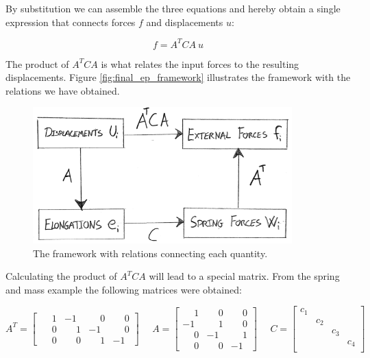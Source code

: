 By substitution we can assemble the three equations and
hereby obtain a single expression that connects forces $f$ and
displacements $u$:

\begin{equation}
\label{eq:f_eq_at_c_a_u}
f = A^T C A \ u
\end{equation}

The product of $A^T C A$ is what relates the input forces to the
resulting displacements. Figure \vref{fig:final_ep_framework}
illustrates the framework with the relations we have obtained.

\begin{figure}
  \centering
  \includegraphics[width=10cm]{./images/equilibrium_framework_final_ep_framework.png}
\caption{The framework with relations connecting each quantity.}
\label{fig:final_ep_framework}
\end{figure}


Calculating the product of $A^T C A$ will
lead to a special matrix. From the spring and mass example the
following matrices were obtained:

\begin{equation*}
A^T = 
\begin{bmatrix}
  \phantom{-}1 &           -1 & \phantom{-}0 & \phantom{-}0 \\
  \phantom{-}0 & \phantom{-}1 &           -1 & \phantom{-}0 \\
  \phantom{-}0 & \phantom{-}0 & \phantom{-}1 &           -1 
\end{bmatrix}
\ \ \ \ \ \
A = 
\begin{bmatrix}
 \phantom{-}1 & \phantom{-}0 & \phantom{-}0 \\
           -1 & \phantom{-}1 & \phantom{-}0 \\
 \phantom{-}0 &           -1 & \phantom{-}1 \\
 \phantom{-}0 & \phantom{-}0 &           -1
\end{bmatrix}
\ \ \ \ \ \
C =
\begin{bmatrix}
c_1 &  &  &  \\
 & c_2 &  &  \\
 &  & c_3 &  \\
 &  &  & c_4 \\
\end{bmatrix}
\end{equation*}

